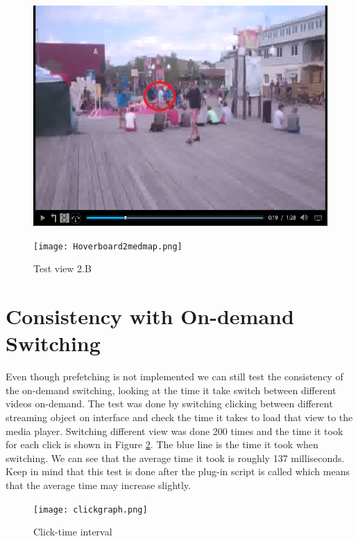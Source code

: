 \begin{figure}[!htb]
  \includegraphics[width=\linewidth]{Hoverboard_2.png}
  \caption{Test view 2.A}\label{fig:testview2A}
\endminipage\hfill
\hspace{3px}
  \texttt{[image: Hoverboard2medmap.png]}
  \caption{Test view 2.B}\label{fig:testview2B}
\endminipage\hfill
\end{figure}

\section{Consistency with On-demand Switching}
Even though prefetching is not implemented we can still test the consistency of the on-demand switching, looking at the time it take switch between different videos on-demand. The test was done by switching clicking between different streaming object on interface and check the time it takes to load that view to the media player. Switching different view was done 200 times and the time it took for each click is shown in Figure \ref{fig:clickgraph}. The blue line is the time it took when switching. We can see that the average time it took is roughly 137 milliseconds. Keep in mind that this test is done after the plug-in script is called which means that the average time may increase slightly. 

\begin{figure}[ht!]
\begin{center}
	\texttt{[image: clickgraph.png]}
	\caption{Click-time interval}
	\label{fig:clickgraph}
\end{center}
\end{figure}